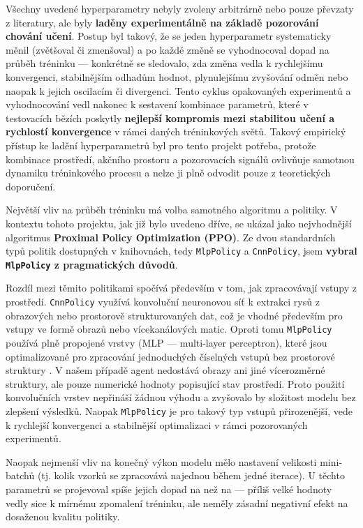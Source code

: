 Všechny uvedené hyperparametry nebyly zvoleny arbitrárně nebo pouze převzaty z literatury, ale byly \textbf{laděny experimentálně na základě pozorování chování učení}. Postup byl takový, že se jeden hyperparametr systematicky měnil (zvětšoval či zmenšoval) a po každé změně se vyhodnocoval dopad na průběh tréninku — konkrétně se sledovalo, zda změna vedla k rychlejšímu konvergenci, stabilnějším odhadům hodnot, plynulejšímu zvyšování odměn nebo naopak k jejich oscilacím či divergenci. Tento cyklus opakovaných experimentů a vyhodnocování vedl nakonec k sestavení kombinace parametrů, které v testovacích bězích poskytly \textbf{nejlepší kompromis mezi stabilitou učení a rychlostí konvergence} v rámci daných tréninkových světů. Takový empirický přístup ke ladění hyperparametrů byl pro tento projekt potřeba, protože kombinace prostředí, akčního prostoru a pozorovacích signálů ovlivňuje samotnou dynamiku tréninkového procesu a nelze ji plně odvodit pouze z teoretických doporučení.

Největší vliv na průběh tréninku má volba samotného algoritmu a politiky. V kontextu tohoto projektu, jak již bylo uvedeno dříve, se ukázal jako nejvhodnější algoritmus \textbf{Proximal Policy Optimization (PPO)}. Ze dvou standardních typů politik dostupných v knihovnách, tedy \texttt{MlpPolicy} a \texttt{CnnPolicy}, jsem \textbf{vybral \texttt{MlpPolicy} z pragmatických důvodů}.

Rozdíl mezi těmito politikami spočívá především v tom, jak zpracovávají vstupy z prostředí. \texttt{CnnPolicy} využívá konvoluční neuronovou síť k extrakci rysů z obrazových nebo prostorově strukturovaných dat, což je vhodné především pro vstupy ve formě obrazů nebo vícekanálových matic. Oproti tomu \texttt{MlpPolicy} používá plně propojené vrstvy (MLP — multi-layer perceptron), které jsou optimalizované pro zpracování jednoduchých číselných vstupů bez prostorové struktury \cite{turn0search0}. V našem případě agent nedostává obrazy ani jiné vícerozměrné struktury, ale pouze numerické hodnoty popisující stav prostředí. Proto použití konvolučních vrstev nepřináší žádnou výhodu a zvyšovalo by složitost modelu bez zlepšení výsledků. Naopak \texttt{MlpPolicy} je pro takový typ vstupů přirozenější, vede k rychlejší konvergenci a stabilnější optimalizaci v rámci pozorovaných experimentů.

Naopak nejmenší vliv na konečný výkon modelu mělo nastavení velikosti mini-batchů (tj. kolik vzorků se zpracovává najednou během jedné iterace). U těchto parametrů se projevoval spíše jejich dopad na  než na  — příliš velké hodnoty vedly sice k mírnému zpomalení tréninku, ale neměly zásadní negativní efekt na dosaženou kvalitu politiky.

